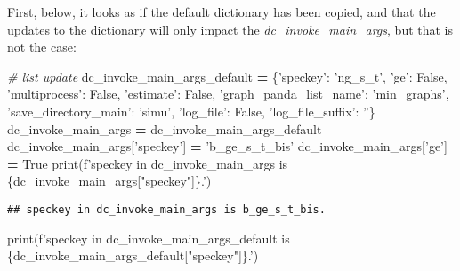 \documentclass[
]{book}
\newenvironment{Shaded}{\begin{snugshade}}{\end{snugshade}}
\newcommand{\BuiltInTok}[1]{#1}
\newcommand{\CommentTok}[1]{\textcolor[rgb]{0.56,0.35,0.01}{\textit{#1}}}
\newcommand{\NormalTok}[1]{#1}
\newcommand{\OperatorTok}[1]{\textcolor[rgb]{0.81,0.36,0.00}{\textbf{#1}}}
\newcommand{\SpecialCharTok}[1]{\textcolor[rgb]{0.00,0.00,0.00}{#1}}
\newcommand{\SpecialStringTok}[1]{\textcolor[rgb]{0.31,0.60,0.02}{#1}}
\newcommand{\StringTok}[1]{\textcolor[rgb]{0.31,0.60,0.02}{#1}}
\newcommand{\VariableTok}[1]{\textcolor[rgb]{0.00,0.00,0.00}{#1}}
\begin{document}
First, below, it looks as if the default dictionary has been copied, and that the updates to the dictionary will only impact the \emph{dc\_invoke\_main\_args}, but that is not the case:

\begin{Shaded}
\begin{Highlighting}[]
\CommentTok{# list update}
\NormalTok{dc_invoke_main_args_default }\OperatorTok{=}\NormalTok{ \{}\StringTok{'speckey'}\NormalTok{: }\StringTok{'ng_s_t'}\NormalTok{,}
                               \StringTok{'ge'}\NormalTok{: }\VariableTok{False}\NormalTok{,}
                               \StringTok{'multiprocess'}\NormalTok{: }\VariableTok{False}\NormalTok{,}
                               \StringTok{'estimate'}\NormalTok{: }\VariableTok{False}\NormalTok{,}
                               \StringTok{'graph_panda_list_name'}\NormalTok{: }\StringTok{'min_graphs'}\NormalTok{,}
                               \StringTok{'save_directory_main'}\NormalTok{: }\StringTok{'simu'}\NormalTok{,}
                               \StringTok{'log_file'}\NormalTok{: }\VariableTok{False}\NormalTok{,}
                               \StringTok{'log_file_suffix'}\NormalTok{: }\StringTok{''}\NormalTok{\}}
\NormalTok{dc_invoke_main_args }\OperatorTok{=}\NormalTok{ dc_invoke_main_args_default}
\NormalTok{dc_invoke_main_args[}\StringTok{'speckey'}\NormalTok{] }\OperatorTok{=} \StringTok{'b_ge_s_t_bis'}
\NormalTok{dc_invoke_main_args[}\StringTok{'ge'}\NormalTok{] }\OperatorTok{=} \VariableTok{True}
\BuiltInTok{print}\NormalTok{(}\SpecialStringTok{f'speckey in dc_invoke_main_args is }\SpecialCharTok{\{}\NormalTok{dc_invoke_main_args[}\StringTok{"speckey"}\NormalTok{]}\SpecialCharTok{\}}\SpecialStringTok{.'}\NormalTok{)}
\end{Highlighting}
\end{Shaded}

\begin{verbatim}
## speckey in dc_invoke_main_args is b_ge_s_t_bis.
\end{verbatim}

\begin{Shaded}
\begin{Highlighting}[]
\BuiltInTok{print}\NormalTok{(}\SpecialStringTok{f'speckey in dc_invoke_main_args_default is }\SpecialCharTok{\{}\NormalTok{dc_invoke_main_args_default[}\StringTok{"speckey"}\NormalTok{]}\SpecialCharTok{\}}\SpecialStringTok{.'}\NormalTok{)}
\end{Highlighting}
\end{Shaded}
\end{document}
